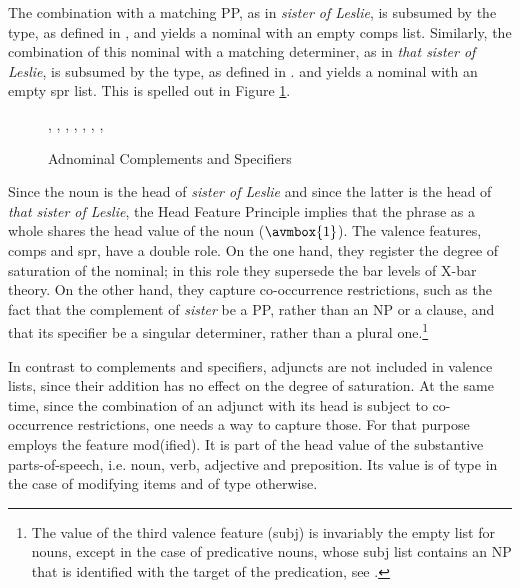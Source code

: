 \documentclass[output=paper]{langsci/langscibook}
\begin{document}
\noindent
The combination with a matching PP, as in \emph{sister of Leslie},   
is subsumed by the  type, as defined in , 
and yields a nominal with an empty {\sc comps} list.  
Similarly, the combination of this nominal with a matching determiner, as in \emph{that sister of Leslie},    
is subsumed by the  type, as defined in . 
and yields a nominal with an empty {\sc spr} list. This is spelled out in Figure \ref{les}. 

\begin{figure}
\begin{center}
\footnotesize
\tree
{,
  {,
    {}},
  {,
    {,
      {}},
    {, 
      {}}}}
\caption{\label{les} Adnominal Complements and Specifiers  }
\normalsize
\end{center}
\end{figure}

Since the noun is the head of \emph{sister of Leslie} and since the latter is 
the head of \emph{that sister of Leslie}, the Head Feature Principle implies 
that the phrase as a whole shares the {\sc head} value of the noun ($\avmbox{1}$). 
The valence features, {\sc comps} and {\sc spr}, have a double role. 
On the one hand, they register the degree of saturation of the nominal; 
in this role they supersede the bar levels of X-bar theory. 
On the other hand, they capture co-occurrence restrictions, 
such as the fact that the complement of \emph{sister} be a PP, rather than an NP or a clause, 
and that its specifier be a singular determiner, rather than a plural one.\footnote{The 
value of the third valence feature ({\sc subj}) is invariably the empty list for nouns, 
except in the case of predicative nouns, whose {\sc subj} list contains an NP 
that is identified with the target of the predication, see \citet[409]{GS00}.}

In contrast to complements and specifiers, adjuncts are not included in valence lists, 
since their addition has no effect on the degree of saturation. At the same time, 
since the combination of an adjunct with its head is subject to 
co-occurrence restrictions, one needs a way to capture those. 
For that purpose \citet[55--57]{ps2} employs the feature {\sc mod(ified)}. 
It is part of the {\sc head} value of the substantive parts-of-speech, 
i.e. noun, verb, adjective and preposition. Its value is of type  
in the case of modifying items and of type  otherwise.
\end{document}
